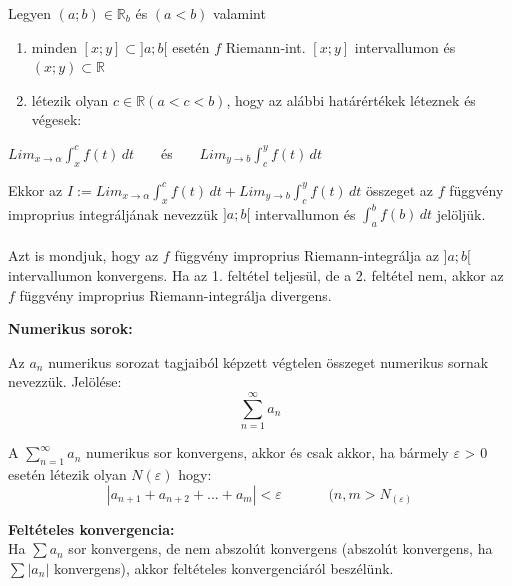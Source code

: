 \documentclass[12pt,a4paper]{article}
\begin{document}
\begin{tcolorbox}[colback=green!5!white,colframe=green!60!black,title= 6. Improprius integrál]
    Legyen \((a; b) \in \mathbb{R}_b \) és \((a < b)\) valamint
    \begin{enumerate}
        \item minden \([x; y] \subset  ]a; b[\) esetén \(f\) Riemann-int. \([x; y]\) intervallumon és \((x; y) \subset \mathbb{R}\)
        \item létezik olyan \(c \in \mathbb{R}  (a < c < b)\), hogy az alábbi határértékek léteznek és végesek:
    \end{enumerate}
    \begin{center}
        \(Lim_{x \to \alpha }\int_{x}^{c} f(t) \,dt\) \(\hspace{15pt}\) és \(\hspace{15pt}\) \(Lim_{y \to b }\int_{c}^{y} f(t) \,dt\)
    \end{center}
    Ekkor az \(I:= Lim_{x \to \alpha }\int_{x}^{c} f(t) \,dt +  Lim_{y \to b }\int_{c}^{y} f(t) \,dt \) összeget az \(f\) függvény improprius integráljának nevezzük \(]a; b[\) intervallumon és \(\int_{a}^{b} f(b) \,dt \) jelöljük.\\\\
    Azt is mondjuk, hogy az \(f\) függvény improprius Riemann-integrálja az \(]a; b[\) intervallumon konvergens.
Ha az 1. feltétel teljesül, de a 2. feltétel nem, akkor az \(f\) függvény improprius Riemann-integrálja
divergens.
\end{tcolorbox}

\newpage
\textbf{Numerikus sorok:}

\begin{tcolorbox}[colback=green!5!white,colframe=green!60!black,title= 1. Numerikus sor fogalma]
    Az \(a_n\) numerikus sorozat tagjaiból képzett végtelen összeget numerikus sornak nevezzük. Jelölése:
    $$\sum_{n = 1}^{\infty} a_n $$
\end{tcolorbox}

\begin{tcolorbox}[colback=green!5!white,colframe=green!60!black,title= 2. Numerikus sor konvergenciája]
A \(\sum_{n = 1}^{\infty} a_n\) numerikus sor konvergens, akkor és csak akkor, ha bármely \(\varepsilon\) > 0 esetén létezik olyan \(N(\varepsilon)\)
hogy:
$$\left\lvert a_{n+1} + a_{n+2} + ... + a_m\right\rvert < \varepsilon \hspace{40pt} (n, m >N_{(\varepsilon)}$$

\textbf{Feltételes konvergencia:}\\
Ha \(\sum a_n\) sor konvergens, de nem abszolút konvergens (abszolút konvergens, ha \(\sum \left\lvert a_n\right\rvert \)  konvergens), akkor feltételes konvergenciáról beszélünk.
\end{tcolorbox}
\end{document}
